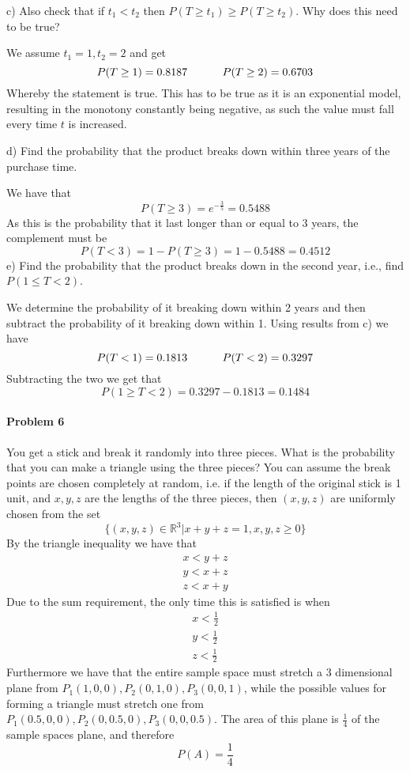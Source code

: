 c) Also check that if $t_{1}<t_{2}$ then $P(T\geq t_{1})\geq P(T\geq t_{2})$. Why does this need to be true?

We assume $t_{1}=1,t_{2}=2$ and get
\[
    P(T\geq 1)=0.8187\hskip 32pt P(T\geq 2)=0.6703
\]
Whereby the statement is true. This has to be true as it is an exponential model, resulting in the monotony constantly being negative, as such the value must fall every time $t$ is increased.

d) Find the probability that the product breaks down within three years of the purchase time.

We have that
\[
    P(T\geq 3)=e^{-\frac{3}{5}}=0.5488
\]
As this is the probability that it last longer than or equal to 3 years, the complement must be
\[
    P(T<3)=1-P(T\geq 3)=1-0.5488=0.4512
\]
e) Find the probability that the product breaks down in the second year, i.e., find $P(1\leq T<2)$.

We determine the probability of it breaking down within 2 years and then subtract the probability of it breaking down within 1. Using results from c) we have
\[
    P(T<1)=0.1813\hskip 32pt P(T<2)=0.3297
\]
Subtracting the two we get that
\[
    P(1\geq T<2)=0.3297-0.1813=0.1484
\]
\paragraph{Problem 6}
You get a stick and break it randomly into three pieces. What is the probability that you can make a triangle using the three pieces? You can assume the break points are chosen completely at random, i.e. if the length of the original stick is 1 unit, and $x,y,z$ are the lengths of the three pieces, then $(x,y,z)$ are uniformly chosen from the set
\[
    \{(x,y,z)\in \mathbb{R}^{3}|x+y+z=1,x,y,z\geq 0\}
\]
By the triangle inequality we have that
\begin{align*}
  x<y+z \\
  y<x+z \\
  z<x+y
\end{align*}
Due to the sum requirement, the only time this is satisfied is when
\begin{align*}
  x<\frac{1}{2} \\
  y<\frac{1}{2} \\
  z<\frac{1}{2}
\end{align*}
Furthermore we have that the entire sample space must stretch a 3 dimensional plane from $P_{1}(1,0,0),P_{2}(0,1,0),P_{3}(0,0,1)$, while the possible values for forming a triangle must stretch one from $P_{1}(0.5,0,0),P_{2}(0,0.5,0),P_{3}(0,0,0.5).$ The area of this plane is $\frac{1}{4}$ of the sample spaces plane, and therefore
\[
    P(A)=\frac{1}{4}
\]
